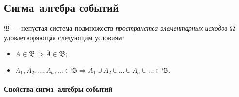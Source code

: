 \subsection{Сигма--алгебра событий}

\begin{definition}
	 $\mathfrak{B}$ --- непустая система подмножеств \textit{пространства элементарных исходов} $\Omega$ удовлетворяющая следующим условиям:
	\begin{itemize}
		\item $A \in \mathfrak{B} \Rightarrow \overline{A} \in \mathfrak{B}$;
		\item $A_1, A_2, \dots, A_n, \dots \in \mathfrak{B} \Rightarrow A_1 \cup A_2 \cup \dots \cup A_n \cup \dots \in \mathfrak{B}$.
	\end{itemize}
\end{definition}


\paragraph{Свойства сигма--алгебры событий}

